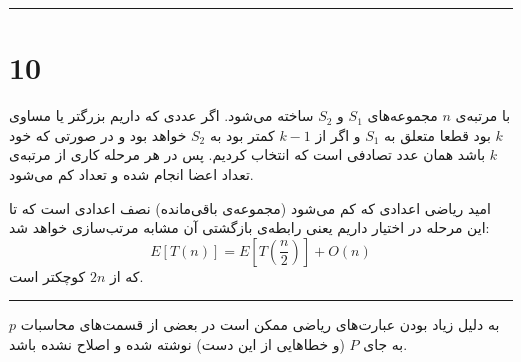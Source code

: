 \documentclass{article}
\begin{document}
\rule{\linewidth}{1pt}
\section*{10}
با مرتبه‌ی
$n$
مجموعه‌های
$S_1$
و
$S_2$
ساخته می‌شود. اگر عددی که داریم بزرگتر یا مساوی
$k$
بود قطعا متعلق به
$S_1$
و اگر از
$k-1$
کمتر بود به
$S_2$
خواهد بود و در صورتی که خود
$k$
باشد همان عدد تصادفی است که انتخاب کردیم. پس در هر مرحله کاری از مرتبه‌ی تعداد اعضا انجام شده و تعداد کم می‌شود.

امید ریاضی اعدادی که کم می‌شود (مجموعه‌ی باقی‌مانده) نصف اعدادی است که تا این مرحله در اختیار داریم یعنی رابطه‌ی بازگشتی آن مشابه مرتب‌سازی خواهد شد:
$$E \left[ T\left( n\right) \right] =E \left[ T\left( \dfrac{n}{2}\right) \right] +O\left( n\right)$$
که از 
$2n$
کوچکتر است.

\rule{\linewidth}{1pt}
به دلیل زیاد بودن عبارت‌های ریاضی ممکن است در بعضی از قسمت‌های محاسبات
$p$
به جای
$P$
(و خطاهایی از این دست)
نوشته شده و اصلاح نشده باشد.
\end{document}
